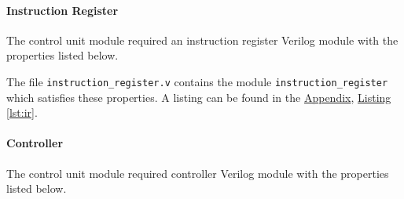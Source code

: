 \paragraph{Instruction Register} \label{par:ir}

The control unit module required an instruction register Verilog module with the properties listed below.


The file \verb|instruction_register.v| contains the module \verb|instruction_register| which satisfies these properties.
A listing can be found in the \hyperref[sec:appendix]{Appendix}, \hyperref[lst:ir]{Listing \ref*{lst:ir}}.

\paragraph{Controller} \label{par:controller}

The control unit module required controller Verilog module with the properties listed below.

